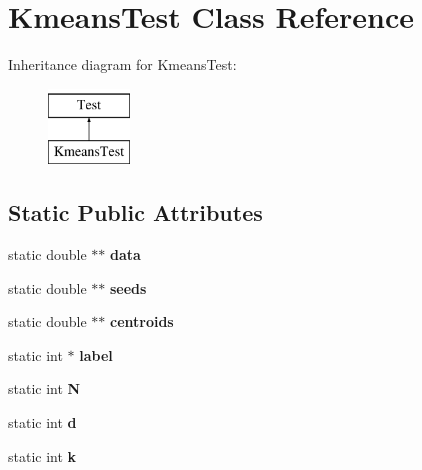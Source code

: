 \hypertarget{classKmeansTest}{\section{Kmeans\-Test Class Reference}
\label{classKmeansTest}
}
Inheritance diagram for Kmeans\-Test\-:\begin{figure}[H]
\begin{center}
\leavevmode
\includegraphics[height=2.000000cm]{classKmeansTest}
\end{center}
\end{figure}
\subsection*{Static Public Attributes}
\begin{DoxyCompactItemize}
\item 
\hypertarget{classKmeansTest_ac49bc85d7f0c6573fdb41291fcad7ea8}{static double $\ast$$\ast$ {\bfseries data}}\label{classKmeansTest_ac49bc85d7f0c6573fdb41291fcad7ea8}

\item 
\hypertarget{classKmeansTest_a02a49c0447e8979c5e42e80798f1909d}{static double $\ast$$\ast$ {\bfseries seeds}}\label{classKmeansTest_a02a49c0447e8979c5e42e80798f1909d}

\item 
\hypertarget{classKmeansTest_ad1d5e54851950f37170c362518fc5aef}{static double $\ast$$\ast$ {\bfseries centroids}}\label{classKmeansTest_ad1d5e54851950f37170c362518fc5aef}

\item 
\hypertarget{classKmeansTest_a25c209617b626d0e70e62fbf7dd2d041}{static int $\ast$ {\bfseries label}}\label{classKmeansTest_a25c209617b626d0e70e62fbf7dd2d041}

\item 
\hypertarget{classKmeansTest_a881736055281c3d2d5f161a57f37b810}{static int {\bfseries N}}\label{classKmeansTest_a881736055281c3d2d5f161a57f37b810}

\item 
\hypertarget{classKmeansTest_a08d592368c02b1aabe71c26b34796bf6}{static int {\bfseries d}}\label{classKmeansTest_a08d592368c02b1aabe71c26b34796bf6}

\item 
\hypertarget{classKmeansTest_a044e6c5eff9a1a3ddb542771c226bd7b}{static int {\bfseries k}}\label{classKmeansTest_a044e6c5eff9a1a3ddb542771c226bd7b}

\end{DoxyCompactItemize}
